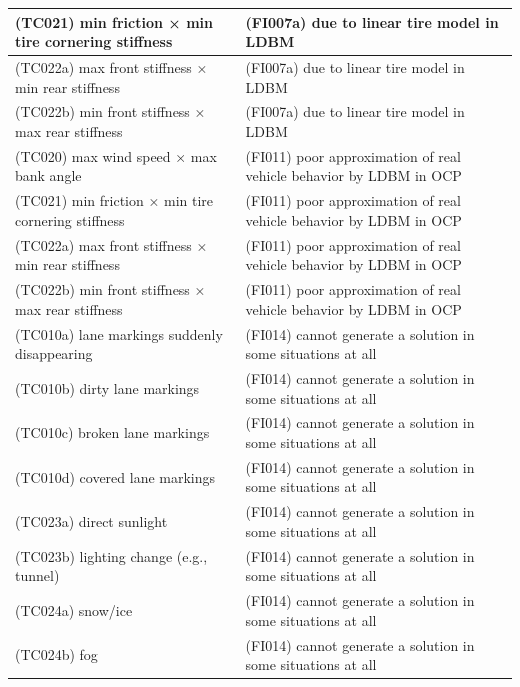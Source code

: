 \documentclass{article}
\begin{document}
\begin{longtable}{|p{8cm}|p{8cm}|}
\cellcolor{cRed}(TC021) min friction × min tire cornering stiffness& \cellcolor{cBlue}(FI007a) due to linear tire model in LDBM\\\hline
\cellcolor{cRed}(TC022a) max front stiffness × min rear stiffness& \cellcolor{cBlue}(FI007a) due to linear tire model in LDBM\\\hline
\cellcolor{cRed}(TC022b) min front stiffness × max rear stiffness& \cellcolor{cBlue}(FI007a) due to linear tire model in LDBM\\\hline
\cellcolor{cRed}(TC020) max wind speed × max bank angle& \cellcolor{cBlue}(FI011) poor approximation of real vehicle behavior by LDBM in OCP\\\hline
\cellcolor{cRed}(TC021) min friction × min tire cornering stiffness& \cellcolor{cBlue}(FI011) poor approximation of real vehicle behavior by LDBM in OCP\\\hline
\cellcolor{cRed}(TC022a) max front stiffness × min rear stiffness& \cellcolor{cBlue}(FI011) poor approximation of real vehicle behavior by LDBM in OCP\\\hline
\cellcolor{cRed}(TC022b) min front stiffness × max rear stiffness& \cellcolor{cBlue}(FI011) poor approximation of real vehicle behavior by LDBM in OCP\\\hline
\cellcolor{cYellow}(TC010a) lane markings suddenly disappearing& \cellcolor{cBlue}(FI014) cannot generate a solution in some situations at all\\\hline
\cellcolor{cYellow}(TC010b) dirty lane markings& \cellcolor{cBlue}(FI014) cannot generate a solution in some situations at all\\\hline
\cellcolor{cYellow}(TC010c) broken lane markings& \cellcolor{cBlue}(FI014) cannot generate a solution in some situations at all\\\hline
\cellcolor{cYellow}(TC010d) covered lane markings& \cellcolor{cBlue}(FI014) cannot generate a solution in some situations at all\\\hline
\cellcolor{cRed}(TC023a) direct sunlight& \cellcolor{cBlue}(FI014) cannot generate a solution in some situations at all\\\hline
\cellcolor{cRed}(TC023b) lighting change (e.g., tunnel)& \cellcolor{cBlue}(FI014) cannot generate a solution in some situations at all\\\hline
\cellcolor{cRed}(TC024a) snow/ice& \cellcolor{cBlue}(FI014) cannot generate a solution in some situations at all\\\hline
\cellcolor{cRed}(TC024b) fog& \cellcolor{cBlue}(FI014) cannot generate a solution in some situations at all\\\hline

\end{longtable}
\end{document}
